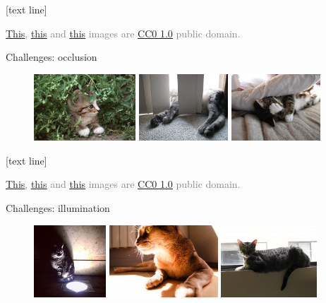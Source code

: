 \documentclass[dvipsnames]{beamer}
\newcommand{\referencefootnote}[1]{\setbeamertemplate{footline}[text line]{%
\parbox{0.9\paperwidth}{\vspace*{-23pt}\tiny{\textcolor{gray}{#1}}\hfill\scriptsize\insertframenumber}}}
\begin{document}
{ \referencefootnote{\href{https://www.flickr.com/photos/imoviesh/41228156474/}{\underline{This}}, \href{https://www.flickr.com/photos/langithijau/3803523814/}{\underline{this}} and \href{https://www.flickr.com/photos/imoviesh/39738183494/}{\underline{this}} images are \href{https://creativecommons.org/publicdomain/zero/1.0/deed.en}{\underline{CC0 1.0}} public domain.}
\begin{frame}{Challenges: occlusion}
\begin{figure}
\includegraphics[height =2.5cm]{figures/occ1.jpg}
\includegraphics[height =2.5cm]{figures/occ2.jpg}
\includegraphics[height =2.5cm]{figures/occ3.jpg}
\end{figure}
\end{frame}
}
{ \referencefootnote{\href{https://www.flickr.com/photos/kartlyn/38205483234/in/photostream/}{\underline{This}}, \href{https://www.flickr.com/photos/perdidoenelsiglo/24680737334/}{\underline{this}} and \href{https://www.flickr.com/photos/dcoetzee/3566532901/}{\underline{this}} images are \href{https://creativecommons.org/publicdomain/zero/1.0/deed.en}{\underline{CC0 1.0}} public domain.}
\begin{frame}{Challenges: illumination}
\begin{figure}
\includegraphics[height =2.7cm]{figures/illu1.jpg}
\includegraphics[height =2.7cm]{figures/illu2.jpg}
\includegraphics[height =2.7cm]{figures/illu3.jpg}
\end{figure}
\end{frame}
}
\end{document}
